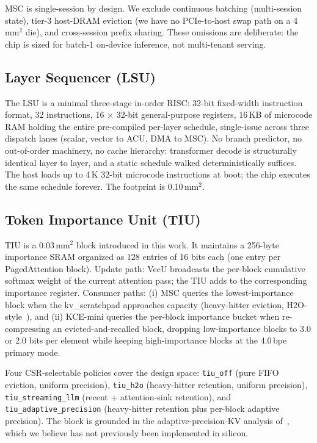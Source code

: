 \documentclass[conference]{IEEEtran}
\begin{document}
MSC is single-session by design. We exclude continuous batching (multi-session state), tier-3 host-DRAM eviction (we have no PCIe-to-host swap path on a 4\,mm$^2$ die), and cross-session prefix sharing. These omissions are deliberate: the chip is sized for batch-1 on-device inference, not multi-tenant serving.

\subsection{Layer Sequencer (LSU)}

The LSU is a minimal three-stage in-order RISC: 32-bit fixed-width instruction format, 32 instructions, 16 $\times$ 32-bit general-purpose registers, 16\,KB of microcode RAM holding the entire pre-compiled per-layer schedule, single-issue across three dispatch lanes (scalar, vector to ACU, DMA to MSC). No branch predictor, no out-of-order machinery, no cache hierarchy: transformer decode is structurally identical layer to layer, and a static schedule walked deterministically suffices. The host loads up to 4\,K 32-bit microcode instructions at boot; the chip executes the same schedule forever. The footprint is 0.10\,mm$^2$.

\subsection{Token Importance Unit (TIU)}

TIU is a 0.03\,mm$^2$ block introduced in this work. It maintains a 256-byte importance SRAM organized as 128 entries of 16 bits each (one entry per PagedAttention block). Update path: VecU broadcasts the per-block cumulative softmax weight of the current attention pass; the TIU adds to the corresponding importance register. Consumer paths: (i) MSC queries the lowest-importance block when the kv\_scratchpad approaches capacity (heavy-hitter eviction, H2O-style~\cite{h2o}), and (ii) KCE-mini queries the per-block importance bucket when re-compressing an evicted-and-recalled block, dropping low-importance blocks to 3.0 or 2.0 bits per element while keeping high-importance blocks at the 4.0\,bpe primary mode.

Four CSR-selectable policies cover the design space: \texttt{tiu\_off} (pure FIFO eviction, uniform precision), \texttt{tiu\_h2o} (heavy-hitter retention, uniform precision), \texttt{tiu\_streaming\_llm} (recent + attention-sink retention), and \texttt{tiu\_adaptive\_precision} (heavy-hitter retention plus per-block adaptive precision). The block is grounded in the adaptive-precision-KV analysis of~\cite{adaptive_kv}, which we believe has not previously been implemented in silicon.
\end{document}
